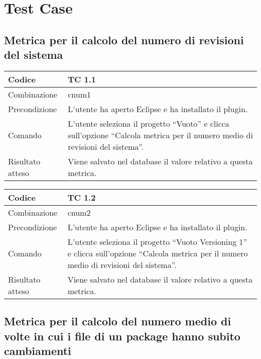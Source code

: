 \chapter{Test Case}

\section{Metrica per il calcolo del numero di revisioni del sistema}

\begin{table}[ht]
\begin{tabular}{|p{3cm}|p{9cm}|}
\hline
\cellcolor{lightgray}Codice				& TC 1.1								\\
\hline
\cellcolor{lightgray}Combinazione		& cnum1									\\
\hline
\cellcolor{lightgray}Precondizione		& L'utente ha aperto Eclipse e ha installato il plugin.		\\
\hline
\cellcolor{lightgray}Comando			& L'utente seleziona il progetto ``Vuoto''  e clicca sull'opzione ``Calcola metrica per il numero medio di revisioni del sistema''.	\\
\hline
\cellcolor{lightgray}Risultato atteso	& Viene salvato nel database il valore relativo a questa metrica.\\
\hline
\end{tabular}
\end{table}

\begin{table}[ht]
\begin{tabular}{|p{3cm}|p{9cm}|}
\hline
\cellcolor{lightgray}Codice				& TC 1.2								\\
\hline
\cellcolor{lightgray}Combinazione		& cnum2									\\
\hline
\cellcolor{lightgray}Precondizione		& L'utente ha aperto Eclipse e ha installato il plugin.		\\
\hline
\cellcolor{lightgray}Comando			& L'utente seleziona il progetto ``Vuoto Versioning 1''  e clicca sull'opzione ``Calcola metrica per il numero medio di revisioni del sistema''.	\\
\hline
\cellcolor{lightgray}Risultato atteso	& Viene salvato nel database il valore relativo a questa metrica.\\
\hline
\end{tabular}
\end{table}
\clearpage

\section{Metrica per il calcolo del numero medio di volte in cui i file di un package hanno subito cambiamenti}

